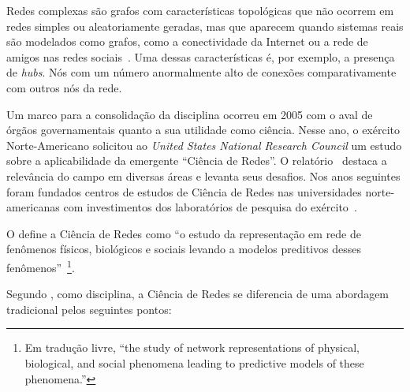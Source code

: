 \documentclass[12pt,a4paper]{article}
\begin{document}
Redes complexas são grafos com características topológicas que não ocorrem em redes simples ou aleatoriamente geradas, mas que aparecem quando sistemas reais são modelados como grafos, como a conectividade da Internet ou a rede de amigos nas redes sociais~\cite{Barabasi2016-rn}. Uma dessas características é, por exemplo, a presença de \textit{hubs}. Nós com um número anormalmente alto de conexões comparativamente com outros nós da rede.

Um marco para a consolidação da disciplina ocorreu em 2005 com o aval de órgãos governamentais quanto a sua utilidade como ciência. Nesse ano, o exército Norte-Americano solicitou ao \textit{United States National Research Council} um estudo sobre a aplicabilidade da emergente \enquote{Ciência de Redes}. O relatório~\cite{National_Research_Council2006-lv} destaca a relevância do campo em diversas áreas e levanta seus desafios. Nos anos seguintes foram fundados centros de estudos de Ciência de Redes nas universidades norte-americanas com investimentos dos laboratórios de pesquisa do exército~\cite{Maxwell2009-kq}.

O  define a Ciência de Redes como \enquote{o estudo da representação em rede de fenômenos físicos, biológicos e sociais levando a modelos preditivos desses fenômenos}~\footnote{Em tradução livre, \enquote{the study of network representations of physical, biological, and social phenomena leading to predictive models of these phenomena.}}.

Segundo , como disciplina, a Ciência de Redes se diferencia de uma abordagem tradicional pelos seguintes pontos:
\end{document}
